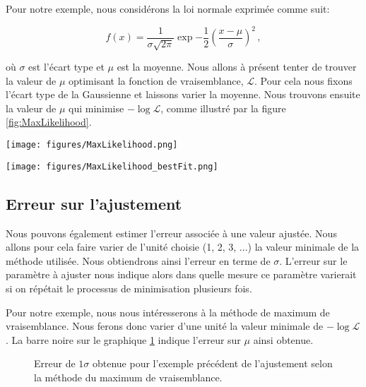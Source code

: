 Pour notre exemple, nous considérons la loi normale exprimée comme suit:

\begin{equation}
f(x) = \frac{1}{\sigma\sqrt{2\pi}} \exp{-\frac{1}{2} \left( \frac{x-\mu}{\sigma}\right)^2} \,  , 
\end{equation}

où $\sigma$ est l'écart type et $\mu$ est la moyenne. Nous allons à présent tenter de trouver la valeur de $\mu$ optimisant la fonction de vraisemblance,  $\mathcal{L}$. Pour cela nous fixons l'écart type de la Gaussienne et laissons varier la moyenne. Nous trouvons ensuite la valeur de $\mu$ qui minimise $-\log{\mathcal{L}}$, comme illustré par la figure \ref{fig:MaxLikelihood}.

\begin{figure*}[h!]
    \centering
    \begin{minipage}[b]{0.49\linewidth}
    \texttt{[image: figures/MaxLikelihood.png]}
    \end{minipage}
    \hfill
    \begin{minipage}[b]{0.49\linewidth}
    \texttt{[image: figures/MaxLikelihood\_bestFit.png]}
    \end{minipage}
    \caption{\textbf{Gauche :} La valeur de $\mu$ minimisant $-\log{\mathcal{L}}$ est désignée par le point orange. \textbf{Droite :} Le fit obtenu à partir de $\mu_{best}$ (orange) est mis en graphique au côté de la distribution des données MC que nous tentions d'ajuster.}
    \label{fig:MaxLikelihood}
\end{figure*}


\subsection{Erreur sur l'ajustement}
Nous pouvons également estimer l'erreur associée à une valeur ajustée. Nous allons pour cela faire varier de l'unité choisie (1, 2, 3, ...) la valeur minimale de la méthode utilisée. Nous obtiendrons ainsi l'erreur en terme de $\sigma$. L'erreur sur le paramètre à ajuster nous indique alors dans quelle mesure ce paramètre varierait si on répétait le processus de minimisation plusieurs fois.

Pour notre exemple, nous nous intéresserons à la méthode de maximum de vraisemblance. Nous ferons donc varier d'une unité la valeur minimale de  $-\log{\mathcal{L}}$. La barre noire sur le graphique \ref{fig:error} indique l'erreur sur $\mu$ ainsi obtenue.


\begin{figure}[h!]
\caption{Erreur de $1\sigma$ obtenue pour l'exemple précédent de l'ajustement selon la méthode du maximum de vraisemblance.}
\label{fig:error}
\end{figure}




